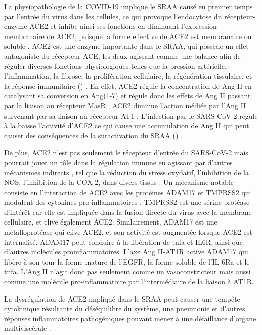 \documentclass[
  a4paper,
  DIV=11,
  numbers=noendperiod,
  listof=totoc]{scrreprt}
\begin{document}
La physiopathologie de la COVID-19 implique le \ac{SRAA} causé en
premier temps par l'entrée du virus dans les cellules, ce qui provoque
l'endocytose du récepteur-enzyme \ac{ACE2} et inhibe ainsi ses fonctions
en diminuant l'expression membranaire de \ac{ACE2}, puisque la forme
effective de \ac{ACE2} est membranaire ou soluble
\autocite{Donoghue.2000}. \ac{ACE2} est une enzyme importante dans le
\ac{SRAA}, qui possède un effet antagoniste du récepteur \ac{ACE}, les
deux agissant comme une balance afin de réguler diverses fonctions
physiologiques telles que la pression artérielle, l'inflammation, la
fibrose, la prolifération cellulaire, la régénération tissulaire, et la
réponse immunitaire ()
\autocite{Brojakowska.2020}. En effet, \ac{ACE2} régule la concentration
de \ac{Ang II} en catalysant sa conversion en \ac{Ang(1-7)} et régule
donc les effets de \ac{Ang II} passant par la liaison au récepteur
\ac{MasR} ; ACE2 diminue l'action médiée par l'\ac{Ang II} survenant par
sa liaison au récepteur AT1 \autocite{Gotelli.2022}. L'infection par le
SARS-CoV-2 régule à la baisse l'activité d'\ac{ACE2} ce qui cause une
accumulation de \ac{Ang II} qui peut causer des conséquences de la
suractivation du SRAA () \autocite{Mahdavi.2020}.

De plus, \ac{ACE2} n'est pas seulement le récepteur d'entrée du
SARS-CoV-2 mais pourrait jouer un rôle dans la régulation immune en
agissant par d'autres mécanismes indirects \autocite{Jiang.2014}, tel
que la réduction du stress oxydatif, l'inhibition de la \ac{NOS},
l'inhibition de la \ac{COX-2}, dans divers tissus \autocite{Jiang.2014}.
Un mécanisme notable consiste en l'interaction de \ac{ACE2} avec les
protéines \ac{ADAM17} et \ac{TMPRSS2} qui modulent des cytokines
pro-inflammatoires \autocite{Zipeto.2020}. \ac{TMPRSS2} est une sérine
protéase d'intérêt car elle est impliquée dans la fusion directe du
virus avec la membrane cellulaire, et clive également \ac{ACE2}.
Similairement, \ac{ADAM17} est une métalloprotéase qui clive \ac{ACE2},
et son activité est augmentée lorsque \ac{ACE2} est internalisé.
\ac{ADAM17} peut conduire à la libération de \ac{tnfa} et IL6R, ainsi
que d'autres molécules proinflammatoires. L'axe Ang II-AT1R active
\ac{ADAM17} qui libère à son tour la forme mature de l'EGFR, la forme
soluble de l'IL-6Ra et le \ac{tnfa}. L'\ac{Ang II} n'agit donc pas
seulement comme un vasoconstricteur mais aussi comme une molécule
pro-inflammatoire par l'intermédiaire de la liaison à AT1R.

La dysrégulation de \ac{ACE2} impliqué dans le \ac{SRAA} peut causer une
tempête cytokinique résultante du déséquilibre du système, une pneumonie
et d'autres réponses inflammatoires pathogéniques pouvant mener à une
défaillance d'organe multiviscérale \autocite{Argano.2023}.
\end{document}
